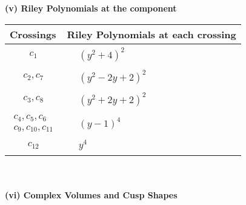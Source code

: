 \documentclass[1p]{elsarticle_modified}
\theoremstyle{definition}
\begin{document}
\newpage\renewcommand{\arraystretch}{1}
\flushleft \textbf{(v) Riley Polynomials at the component}\newline \\
\begin{tabular}{m{50pt}|m{274pt}}
Crossings & \hspace{64pt}Riley Polynomials at each crossing \\
\hline $$\begin{aligned}c_{1}\end{aligned}$$&$\begin{aligned}
&(y^2+4)^2
\end{aligned}$\\
\hline $$\begin{aligned}c_{2},c_{7}\end{aligned}$$&$\begin{aligned}
&(y^2-2 y+2)^2
\end{aligned}$\\
\hline $$\begin{aligned}c_{3},c_{8}\end{aligned}$$&$\begin{aligned}
&(y^2+2 y+2)^2
\end{aligned}$\\
\hline $$\begin{aligned}c_{4},c_{5},c_{6}\\c_{9},c_{10},c_{11}\end{aligned}$$&$\begin{aligned}
&(y-1)^4
\end{aligned}$\\
\hline $$\begin{aligned}c_{12}\end{aligned}$$&$\begin{aligned}
&y^4
\end{aligned}$\\
\hline
\end{tabular}\\~\\
\newpage\flushleft \textbf{(vi) Complex Volumes and Cusp Shapes}
\end{document}

